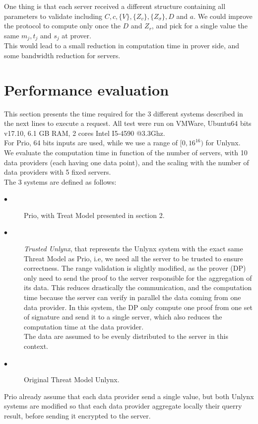 \documentclass{article}
\begin{document}
One thing is that each server received a different structure containing all parameters to validate including $C, c, \{V\}, \{Z_v\} ,\{ Z_{\sigma}\}, D $ and $a$. We could improve the protocol to compute only once the $D$ and $Z_r$, and pick for a single value the same $m_j, t_j$ and $s_j$ at prover.\\
This would lead to a small reduction in computation time in prover side, and some bandwidth reduction for servers.

\section{Performance evaluation}

This section presents the time required for the 3 different systems described in the next lines to execute a request. All test were run on VMWare, Ubuntu64 bits v17.10, 6.1 GB RAM, 2 cores Intel I5-4590 @3.3Ghz.\\
For Prio, 64 bits inputs are used, while we use a range of $[0,16^{16})$ for Unlynx.\\
We evaluate the computation time in function of the number of servers, with 10 data providers (each having one data point), and the scaling with the number of data providers with 5 fixed servers.\\
The 3 systems are defined as follows:
\begin{description}
\item[$\bullet$] Prio, with Treat Model presented in section 2.
\item[$\bullet$] \textit{Trusted Unlynx}, that represents the Unlynx system with the exact same Threat Model as Prio, i.e, we need all the server to be trusted to ensure correctness. The range validation is slightly modified, as the prover (DP) only need to send the proof to the server responsible for the aggregation of its data. This reduces drastically the communication, and the computation time because the server can verify in parallel the data coming from one data provider. In this system, the DP only compute one proof from one set of signature and send it to a single server, which also reduces the computation time at the data provider.\\
The data are assumed to be evenly distributed to the server in this context.
\item[$\bullet$] Original Threat Model Unlynx.
\end{description}

Prio already assume that each data provider send a single value, but both Unlynx systems are modified so that each data provider aggregate locally their querry result, before sending it encrypted to the server.
\end{document}
